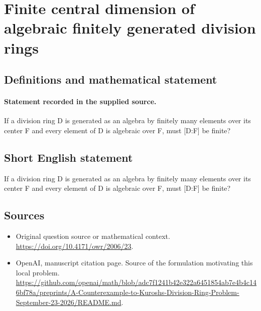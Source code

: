 \documentclass[11pt]{article}
\begin{document}
\section*{Finite central dimension of algebraic finitely generated division rings}\label{30007000}
\subsection{Definitions and mathematical statement}
\paragraph{Statement recorded in the supplied source.}
If a division ring D is generated as an algebra by finitely many elements over its center F and every element of D is algebraic over F, must [D:F] be finite?
\subsection{Short English statement}
If a division ring D is generated as an algebra by finitely many elements over its center F and every element of D is algebraic over F, must [D:F] be finite?
\subsection{Sources}
\begin{itemize}
\item[S1] Original question source or mathematical context.
\url{https://doi.org/10.4171/owr/2006/23}.
\item[S2] OpenAI, manuscript citation page. Source of the formulation motivating this local problem.
\url{https://github.com/openai/math/blob/adc7f1241b42e322a6451854ab7e4b4c146bf78a/preprints/A-Counterexample-to-Kuroshs-Division-Ring-Problem-September-23-2026/README.md}.
\end{itemize}
\end{document}
